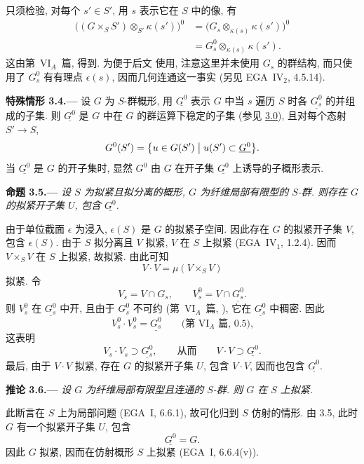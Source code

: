 只须检验, 对每个 \(s'\in S'\), 用 \(s\) 表示它在 \(S\) 中的像, 有
\[
  \begin{aligned}
  \bigl((G\times_S S')\otimes_{S'}\kappa(s')\bigr)^0
    &=
  \bigl(G_s\otimes_{\kappa(s)}\kappa(s')\bigr)^0 \\
    &=
  G_s^0\otimes_{\kappa(s)}\kappa(s').
  \end{aligned}
\]
这由第~VI\(_A\)~篇,  得到.
为便于后文  使用,
注意这里并未使用 \(G_s\) 的群结构,
而只使用了 \(G_s^0\) 有有理点 \(\epsilon(s)\),
因而几何连通这一事实 (另见 EGA~IV\(_2\), 4.5.14).

\medskip
{}\label{case:sga3-VIB-3.4}%
\noindent\textbf{特殊情形 3.4.---}
设 \(G\) 为 \(S\)-群概形, 用 \(\underline{G^0}\)
表示 \(G\) 中当 \(s\) 遍历 \(S\) 时各 \(\underline{G_s^0}\)
的并组成的子集.
则 \(\underline{G^0}\) 是 \(G\) 中在 \(G\) 的群运算下稳定的子集
(参见 \hyperref[par:sga3-VIB-3.0]{3.0}), 且对每个态射 \(S'\to S\),
\[
  G^0(S')
    =
  \bigl\{u\in G(S')\bigm|
    u(S')\subset\underline{G^0}\bigr\}.
\]
当 \(\underline{G^0}\) 是 \(G\) 的开子集时,
显然 \(G^0\) 由 \(G\) 在开子集 \(\underline{G^0}\) 上诱导的子概形表示.

\medskip
{}\label{prop:sga3-VIB-3.5}%
\noindent\textbf{命题 3.5.---}
\emph{设 \(S\) 为拟紧且拟分离的概形,
\(G\) 为纤维局部有限型的 \(S\)-群.
则存在 \(G\) 的拟紧开子集 \(U\), 包含 \(\underline{G^0}\).}

由于单位截面 \(\epsilon\) 为浸入,
\(\epsilon(S)\) 是 \(G\) 的拟紧子空间.
因此存在 \(G\) 的拟紧开子集 \(V\), 包含 \(\epsilon(S)\).
由于 \(S\) 拟分离且 \(V\) 拟紧,
\(V\) 在 \(S\) 上拟紧 (EGA~IV\(_1\), 1.2.4).
因而 \(V\times_SV\) 在 \(S\) 上拟紧, 故拟紧.
由此可知
\[
  V\cdot V=\mu(V\times_SV)
\]
拟紧. 令
\[
  V_s=V\cap G_s,
  \qquad
  V_s^0=V\cap\underline{G_s^0}.
\]
则 \(V_s^0\) 在 \(\underline{G_s^0}\) 中开,
且由于 \(G_s^0\) 不可约
(第~VI\(_A\)~篇, ),
它在 \(\underline{G_s^0}\) 中稠密. 因此
\[
  V_s^0\cdot V_s^0=\underline{G_s^0}
  \qquad
  \text{(第~VI\(_A\)~篇, 0.5),}
\]
这表明
\[
  V_s\cdot V_s\supset\underline{G_s^0},
  \qquad\text{从而}\qquad
  V\cdot V\supset\underline{G^0}.
\]
最后, 由于 \(V\cdot V\) 拟紧,
存在 \(G\) 的拟紧开子集 \(U\), 包含 \(V\cdot V\),
因而也包含 \(\underline{G^0}\).

\medskip
{}\label{cor:sga3-VIB-3.6}%
\noindent\textbf{推论 3.6.---}
\emph{设 \(G\) 为纤维局部有限型且连通的 \(S\)-群.
则 \(G\) 在 \(S\) 上拟紧.}

此断言在 \(S\) 上为局部问题 (EGA~I, 6.6.1),
故可化归到 \(S\) 仿射的情形.
由 3.5, 此时 \(G\) 有一个拟紧开子集 \(U\), 包含
\[
  \underline{G^0}=G.
\]
因此 \(G\) 拟紧, 因而在仿射概形 \(S\) 上拟紧 (EGA~I, 6.6.4(v)).
